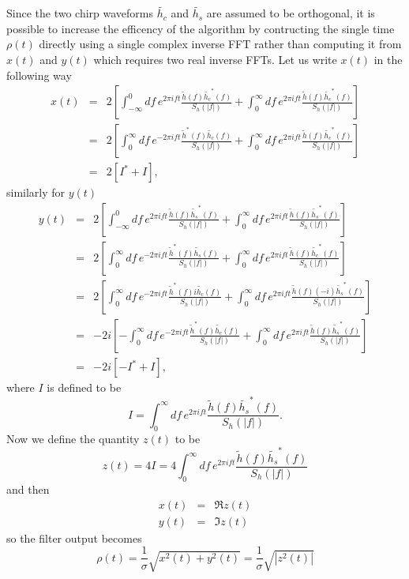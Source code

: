 Since the two chirp waveforms $\tilde{h_c}$ and $\tilde{h_s}$ are assumed to
be orthogonal, it is possible to increase the efficency of the algorithm by
contructing the single time $\rho(t)$ directly using a single complex inverse
FFT rather than computing it from $x(t)$ and $y(t)$ which requires two real
inverse FFTs. Let us write $x(t)$ in the following way
\begin{eqnarray}
x(t) 
&=& 2 \left[ 
\int_{-\infty}^{0} df\, e^{2\pi i f t} \frac{\tilde{h}(f)
\tilde{h_c}^\ast(f)}{S_h\left(\left|f\right|\right)}
+ \int_{0}^{\infty} df\, e^{2\pi i f t} \frac{\tilde{h}(f)
\tilde{h_c}^\ast(f)}{S_h\left(\left|f\right|\right)} 
\right] \\
&=& 2 \left[ 
\int_{0}^{\infty} df\, e^{-2\pi i f t} \frac{\tilde{h}^\ast(f)
\tilde{h_c}(f)}{S_h\left(\left|f\right|\right)}
+ \int_{0}^{\infty} df\, e^{2\pi i f t} \frac{\tilde{h}(f)
\tilde{h_c}^\ast(f)}{S_h\left(\left|f\right|\right)} 
\right] \\
&=& 2 \left[ I^\ast + I \right],
\end{eqnarray}
similarly for $y(t)$
\begin{eqnarray}
y(t) 
&=& 2 \left[ 
\int_{-\infty}^{0} df\, e^{2\pi i f t} \frac{\tilde{h}(f)
\tilde{h_s}^\ast(f)}{S_h\left(\left|f\right|\right)}
+ \int_{0}^{\infty} df\, e^{2\pi i f t} \frac{\tilde{h}(f)
\tilde{h_s}^\ast(f)}{S_h\left(\left|f\right|\right)} 
\right] \\
&=& 2 \left[ 
\int_{0}^{\infty} df\, e^{-2\pi i f t} \frac{\tilde{h}^\ast(f)
\tilde{h_s}(f)}{S_h\left(\left|f\right|\right)}
+ \int_{0}^{\infty} df\, e^{2\pi i f t} \frac{\tilde{h}(f)
\tilde{h_c}^\ast(f)}{S_h\left(\left|f\right|\right)} 
\right] \\
&=& 2 \left[ 
\int_{0}^{\infty} df\, e^{-2\pi i f t} \frac{\tilde{h}^\ast(f)
i\tilde{h_c}(f)}{S_h\left(\left|f\right|\right)}
+ \int_{0}^{\infty} df\, e^{2\pi i f t} \frac{\tilde{h}(f)
(-i)\tilde{h_s}^\ast(f)}{S_h\left(\left|f\right|\right)} 
\right] \\
&=& -2i \left[ 
- \int_{0}^{\infty} df\, e^{-2\pi i f t} \frac{\tilde{h}^\ast(f)
\tilde{h_c}(f)}{S_h\left(\left|f\right|\right)}
+ \int_{0}^{\infty} df\, e^{2\pi i f t} \frac{\tilde{h}(f)
\tilde{h_s}^\ast(f)}{S_h\left(\left|f\right|\right)} 
\right] \\
&=& -2i \left[ - I^\ast + I \right],
\end{eqnarray}
where $I$ is defined to be
\begin{equation}
I = \int_{0}^{\infty} df\, e^{2\pi i f t}\frac{\tilde{h}(f)
\tilde{h_s}^\ast(f)}{S_h\left(\left|f\right|\right)}.
\end{equation}
Now we define the quantity $z(t)$ to be
\begin{equation}
z(t) = 4 I = 4 \int_{0}^{\infty} df\, e^{2\pi i f t}\frac{\tilde{h}(f)
\tilde{h_s}^\ast(f)}{S_h\left(\left|f\right|\right)}
\end{equation}
and then
\begin{eqnarray}
x(t) &=& \Re z(t) \\
y(t) &=& \Im z(t)
\end{eqnarray}
so the filter output becomes
\begin{equation}
\rho(t) = \frac{1}{\sigma} \sqrt{x^2(t) + y^2(t)} 
= \frac{1}{\sigma} \sqrt{|z^2(t)|}
\end{equation}
